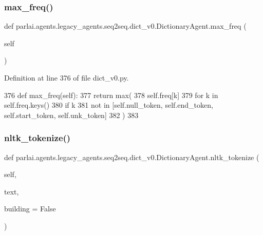 \subsubsection{\texorpdfstring{max\+\_\+freq()}{max\_freq()}}
{\footnotesize\ttfamily def parlai.\+agents.\+legacy\+\_\+agents.\+seq2seq.\+dict\+\_\+v0.\+Dictionary\+Agent.\+max\+\_\+freq (\begin{DoxyParamCaption}\item[{}]{self }\end{DoxyParamCaption})}



Definition at line 376 of file dict\+\_\+v0.\+py.


\begin{DoxyCode}
376     \textcolor{keyword}{def }max\_freq(self):
377         \textcolor{keywordflow}{return} max(
378             self.freq[k]
379             \textcolor{keywordflow}{for} k \textcolor{keywordflow}{in} self.freq.keys()
380             \textcolor{keywordflow}{if} k
381             \textcolor{keywordflow}{not} \textcolor{keywordflow}{in} [self.null\_token, self.end\_token, self.start\_token, self.unk\_token]
382         )
383 
\end{DoxyCode}
\mbox{\label{classparlai_1_1agents_1_1legacy__agents_1_1seq2seq_1_1dict__v0_1_1DictionaryAgent_a67ebc0fd49a9bcb850ae3d693b29b304}} 
\subsubsection{\texorpdfstring{nltk\+\_\+tokenize()}{nltk\_tokenize()}}
{\footnotesize\ttfamily def parlai.\+agents.\+legacy\+\_\+agents.\+seq2seq.\+dict\+\_\+v0.\+Dictionary\+Agent.\+nltk\+\_\+tokenize (\begin{DoxyParamCaption}\item[{}]{self,  }\item[{}]{text,  }\item[{}]{building = {\ttfamily False} }\end{DoxyParamCaption})}

